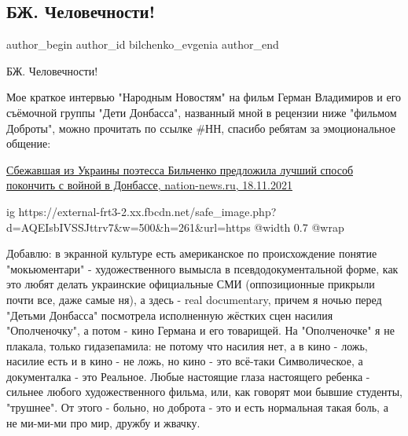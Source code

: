  
 
 
 
 
 
\subsection{БЖ. Человечности!}
\label{sec:18_11_2021.fb.bilchenko_evgenia.2.chelovechnosti}
 
\ifcmt
 author_begin
   author_id bilchenko_evgenia
 author_end
\fi

БЖ. Человечности! 

Мое краткое интервью "Народным Новостям" на фильм Герман Владимиров и его
съёмочной группы "Дети Донбасса", названный мной в рецензии ниже "фильмом
Доброты", можно прочитать по ссылке \#НН, спасибо ребятам за эмоциональное
общение:

\href{https://nation-news.ru/673148-sbezhavshaya-iz-ukrainy-poetessa-bilchenko-predlozhila-luchshii-sposob-pokonchit-s-voinoi-v-donbasse}{%
Сбежавшая из Украины поэтесса Бильченко предложила лучший способ покончить с войной в Донбассе, %
nation-news.ru, 18.11.2021%
}

\ifcmt
	ig https://external-frt3-2.xx.fbcdn.net/safe_image.php?d=AQEIsbIVSSJttrv7&w=500&h=261&url=https%
  @width 0.7
  @wrap \parpic[r]
\fi

Добавлю: в экранной культуре есть американское по происхождение понятие
"мокьюментари" - художественного вымысла в псевдодокументальной форме, как это
любят делать украинские официальные СМИ (оппозиционные прикрыли почти все, даже
самые ня), а здесь - real documentary, причем я ночью перед "Детьми Донбасса"
посмотрела исполненную жёстких сцен насилия "Ополченочку", а потом - кино
Германа и его товарищей. На "Ополченочке" я не плакала, только гидазепамила: не
потому что насилия нет, а в кино - ложь, насилие есть и в кино - не ложь, но
кино - это всё-таки Символическое, а документалка - это Реальное. Любые
настоящие глаза настоящего ребенка - сильнее любого художественного фильма,
или, как говорят мои бывшие студенты, "трушнее". От этого - больно, но доброта
- это и есть нормальная такая боль, а не ми-ми-ми про мир, дружбу и жвачку. 

